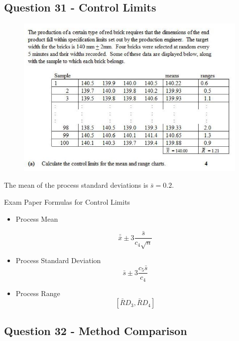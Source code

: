 \documentclass[a4paper,12pt]{article}
\begin{document}
\subsection*{Question 31 - Control Limits }
\begin{figure}[h!]
\centering
\includegraphics[width=1.1\linewidth]{images/ReviewQ31}

\end{figure}
The mean of the process standard deviations is $\bar{s} =0.2$.
\begin{framed}
	Exam Paper Formulas for Control Limits
	\begin{itemize}
		\item Process Mean
		
		
		
		\[ \bar{\bar{x}} \pm 3\frac{\bar{s}}{c_4\sqrt{n}}\]
		\item Process Standard Deviation	
		\[ \bar{s} \pm 3\frac{c_5\bar{s}}{c_4}\]
		\item Process Range	
		\[\left[ \bar{R}D_3, \bar{R}D_4\right]\]
	\end{itemize}	
\end{framed}
\newpage
\subsection*{Question 32 - Method Comparison}
\end{document}
